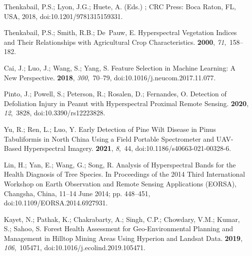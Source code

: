 \documentclass[remotesensing,article,accept,moreauthors,pdftex]{Definitions/mdpi}
\begin{document}
\begin{thebibliography}{999}
Thenkabail, P.S.; Lyon, J.G.; Huete, A. (Eds.)
; {CRC Press}:  Boca Raton, FL, USA, 2018, doi:10.1201/9781315159331.

Thenkabail, P.S.; Smith, R.B.; De~Pauw, E.
\newblock Hyperspectral Vegetation Indices and Their Relationships with
  Agricultural Crop Characteristics.
 {\bf 2000}, {\em 71},~158--182.

Cai, J.; Luo, J.; Wang, S.; Yang, S.
\newblock Feature Selection in Machine Learning: A New Perspective.
 {\bf 2018}, {\em 300},~70--79, doi:10.1016/j.neucom.2017.11.077.

Pinto, J.; Powell, S.; Peterson, R.; Rosalen, D.; Fernandes, O.
\newblock Detection of {{Defoliation Injury}} in {{Peanut}} with
  {{Hyperspectral Proximal Remote Sensing}}.
 {\bf 2020}, {\em 12},~3828, doi:10.3390/rs12223828.

Yu, R.; Ren, L.; Luo, Y.
\newblock Early Detection of Pine Wilt Disease in {{Pinus}} Tabuliformis in
  {{North China}} Using a Field Portable Spectrometer and {{UAV}}-Based
  Hyperspectral Imagery.
 {\bf 2021}, {\em 8},~44, doi:10.1186/s40663-021-00328-6.

Lin, H.; Yan, E.; Wang, G.; Song, R.
\newblock Analysis of Hyperspectral Bands for the Health Diagnosis of Tree
  Species.
\newblock  In Proceedings of the 2014 {{Third International Workshop}} on {{Earth Observation}} and
  {{Remote Sensing Applications}} ({{EORSA}}), Changsha, China, 11--14 June 2014; pp. 448--451, doi:10.1109/EORSA.2014.6927931.

Kayet, N.; Pathak, K.; Chakrabarty, A.; Singh, C.P.; Chowdary, V.M.; Kumar, S.;
  Sahoo, S.
\newblock Forest Health Assessment for Geo-Environmental Planning and
  Management in Hilltop Mining Areas Using {{Hyperion}} and {{Landsat}} Data.
 {\bf 2019}, {\em 106},~105471, doi:10.1016/j.ecolind.2019.105471.


\end{thebibliography}
\end{document}
